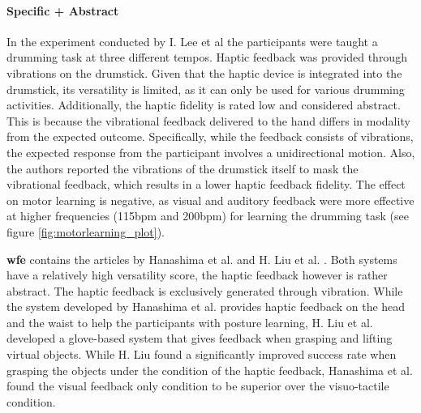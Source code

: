 \paragraph{Specific + Abstract}
\label{sec:specificabstract}
In the experiment conducted by I. Lee et al \cite{Lee2012} the participants were taught a drumming task at three different tempos. Haptic feedback was provided through vibrations on the drumstick. Given that the haptic device is integrated into the drumstick, its versatility is limited, as it can only be used for various drumming activities. Additionally, the haptic fidelity is rated low and considered abstract. This is because the vibrational feedback delivered to the hand differs in modality from the expected outcome. Specifically, while the feedback consists of vibrations, the expected response from the participant involves a unidirectional motion. Also, the authors reported the vibrations of the drumstick itself to mask the vibrational feedback, which results in a lower haptic feedback fidelity. The effect on motor learning is negative, as visual and auditory feedback were more effective at higher frequencies (115bpm and 200bpm) for learning the drumming task (see figure \ref{fig:motorlearning_plot}).



\textbf{wfe} contains the articles by Hanashima et al. and H. Liu et al. \cite{Hanashima2023, LiuH2019}. Both systems have a relatively high versatility score, the haptic feedback however is rather abstract. The haptic feedback is exclusively generated through vibration. While the system developed by Hanashima et al. provides haptic feedback on the head and the waist to help the participants with posture learning, H. Liu et al. developed a glove-based system that gives feedback when grasping and lifting virtual objects. While H. Liu found a significantly improved success rate when grasping the objects under the condition of the haptic feedback, Hanashima et al. found the visual feedback only condition to be superior over the visuo-tactile condition. 


